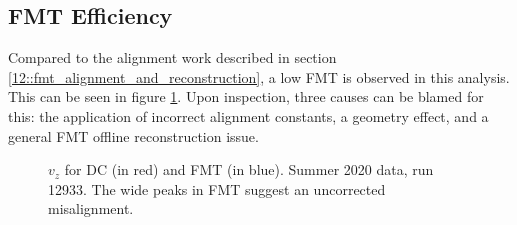 \subsection{FMT Efficiency}
\label{14.10::fmt_efficiency}
    Compared to the alignment work described in section \ref{12::fmt_alignment_and_reconstruction}, a low FMT is observed in this analysis.
    This can be seen in figure \ref{fig::14.10::vz_012933}.
    Upon inspection, three causes can be blamed for this: the application of incorrect alignment constants, a geometry effect, and a general FMT offline reconstruction issue.

    \begin{figure}[b!]
        \centering{}
        \caption[$v_z$ for DC and FMT, run 12933]{$v_z$ for DC (in red) and FMT (in blue). Summer 2020 data, run 12933. The wide peaks in FMT suggest an uncorrected misalignment.}
        \label{fig::14.10::vz_012933}
    \end{figure}

    
    
    
    
